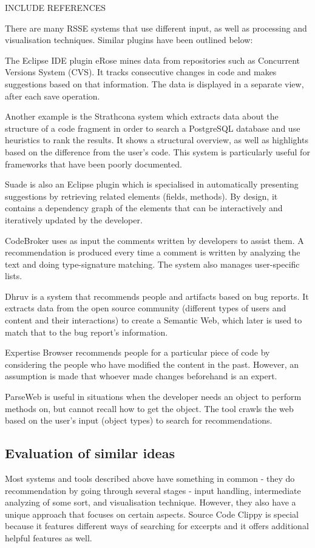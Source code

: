 \documentclass{l4proj}
\begin{document}
INCLUDE REFERENCES

There are many RSSE systems that use different input, as well as processing and visualisation techniques. Similar plugins have been outlined below:

The Eclipse IDE plugin eRose mines data from repositories such as Concurrent Versions System (CVS). It tracks consecutive changes in code and makes suggestions based on that information. The data is displayed in a separate view, after each save operation.

Another example is the Strathcona system which extracts data about the structure of a code fragment in order to search a PostgreSQL database and use heuristics to rank the results. It shows a structural overview, as well as highlights based on the difference from the user's code. This system is particularly useful for frameworks that have been poorly documented.

Suade is also an Eclipse plugin which is specialised in automatically presenting suggestions by retrieving related elements (fields, methods). By design, it contains a dependency graph of the elements that can be interactively and iteratively updated by the developer.

CodeBroker uses as input the comments written by developers to assist them. A recommendation is produced every time a comment is written by analyzing the text and doing type-signature matching. The system also manages user-specific lists.

Dhruv is a system that recommends people and artifacts based on bug reports. It extracts data from the open source community (different types of users and content and their interactions) to create a Semantic Web, which later is used to match that to the bug report's information.

Expertise Browser recommends people for a particular piece of code by considering the people who have modified the content in the past. However, an assumption is made that whoever made changes beforehand is an expert.

ParseWeb is useful in situations when the developer needs an object to perform methods on, but cannot recall how to get the object. The tool crawls the web based on the user's input (object types) to search for recommendations.

\subsection{Evaluation of similar ideas}
Most systems and tools described above have something in common - they do recommendation by going through several stages - input handling, intermediate analyzing of some sort, and visualisation technique. However, they also have a unique approach that focuses on certain aspects. Source Code Clippy is special because it features different ways of searching for excerpts and it offers additional helpful features as well.
\end{document}
